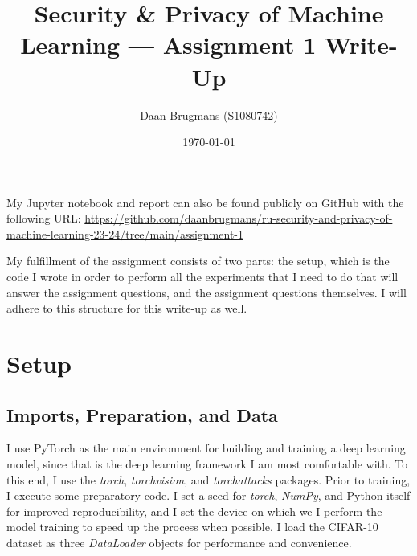 \documentclass{article}
\begin{document}
\title{Security \& Privacy of Machine Learning --- Assignment 1 Write-Up}
\author{Daan Brugmans (S1080742)}
\date{\today}

\maketitle

My Jupyter notebook and report can also be found publicly on GitHub with the following URL: \url{https://github.com/daanbrugmans/ru-security-and-privacy-of-machine-learning-23-24/tree/main/assignment-1}

My fulfillment of the assignment consists of two parts: the setup, which is the code I wrote in order to perform all the experiments that I need to do that will answer the assignment questions, and the assignment questions themselves.
I will adhere to this structure for this write-up as well.

\section{Setup}
\subsection{Imports, Preparation, and Data}
I use PyTorch as the main environment for building and training a deep learning model, since that is the deep learning framework I am most comfortable with. 
To this end, I use the \textit{torch}, \textit{torchvision}, and \textit{torchattacks} packages.
Prior to training, I execute some preparatory code.
I set a seed for \textit{torch}, \textit{NumPy}, and Python itself for improved reproducibility, and I set the device on which we I perform the model training to speed up the process when possible.
I load the CIFAR-10 dataset as three \textit{DataLoader} objects for performance and convenience.
\end{document}
